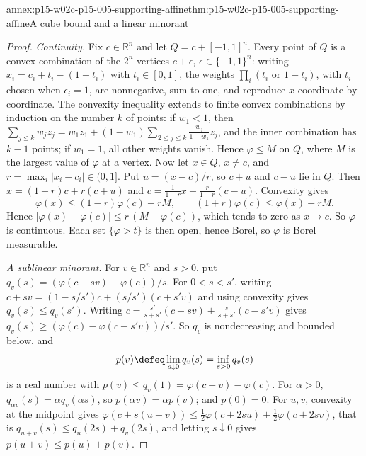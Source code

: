 \begin{annexitem}{annex:p15-w02c-p15-005-supporting-affine}{thm:p15-w02c-p15-005-supporting-affine}{A cube bound and a linear minorant}
\begin{proof}
\emph{Continuity.} Fix \(c\in\mathbb R^n\) and let
\(Q=c+[-1,1]^n\). Every point of \(Q\) is a convex combination of the
\(2^n\) vertices \(c+\epsilon\), \(\epsilon\in\{-1,1\}^n\): writing
\(x_i=c_i+t_i-(1-t_i)\) with \(t_i\in[0,1]\), the weights
\(\prod_i(t_i\text{ or }1-t_i)\), with \(t_i\) chosen when
\(\epsilon_i=1\), are nonnegative, sum to one, and reproduce \(x\)
coordinate by coordinate. The convexity inequality extends to finite
convex combinations by induction on the number \(k\) of points: if
\(w_1<1\), then
\(\sum_{j\leq k}w_jz_j=w_1z_1+(1-w_1)\sum_{2\leq j\leq k}\frac{w_j}{1-w_1}z_j\),
and the inner combination has \(k-1\) points; if \(w_1=1\), all other
weights vanish. Hence \(\varphi\leq M\) on \(Q\), where \(M\) is the
largest value of \(\varphi\) at a vertex. Now let \(x\in Q\),
\(x\neq c\), and \(r=\max_i|x_i-c_i|\in(0,1]\). Put
\(u=(x-c)/r\), so \(c+u\) and \(c-u\) lie in \(Q\). Then
\(x=(1-r)c+r(c+u)\) and \(c=\frac1{1+r}x+\frac r{1+r}(c-u)\). Convexity
gives
\[
 \varphi(x)\leq(1-r)\varphi(c)+rM,\qquad
 (1+r)\varphi(c)\leq\varphi(x)+rM .
\]
Hence \(|\varphi(x)-\varphi(c)|\leq r\,(M-\varphi(c))\), which tends to
zero as \(x\to c\). So \(\varphi\) is continuous. Each set
\(\{\varphi>t\}\) is then open, hence Borel, so \(\varphi\) is Borel
measurable.

\emph{A sublinear minorant.} For \(v\in\mathbb R^n\) and \(s>0\), put
\(q_v(s)=(\varphi(c+sv)-\varphi(c))/s\). For \(0<s<s'\), writing
\(c+sv=(1-s/s')c+(s/s')(c+s'v)\) and using convexity gives
\(q_v(s)\leq q_v(s')\). Writing
\(c=\frac{s'}{s+s'}(c+sv)+\frac s{s+s'}(c-s'v)\) gives
\(q_v(s)\geq(\varphi(c)-\varphi(c-s'v))/s'\). So \(q_v\) is
nondecreasing and bounded below, and
\[
 p(v)\defeq\lim_{s\downarrow0}q_v(s)=\inf_{s>0}q_v(s)
\]
is a real number with \(p(v)\leq q_v(1)=\varphi(c+v)-\varphi(c)\). For
\(\alpha>0\), \(q_{\alpha v}(s)=\alpha q_v(\alpha s)\), so
\(p(\alpha v)=\alpha p(v)\); and \(p(0)=0\). For \(u,v\), convexity at
the midpoint gives
\(\varphi(c+s(u+v))\leq\frac12\varphi(c+2su)+\frac12\varphi(c+2sv)\),
that is \(q_{u+v}(s)\leq q_u(2s)+q_v(2s)\), and letting
\(s\downarrow0\) gives \(p(u+v)\leq p(u)+p(v)\).


\end{proof}
\end{annexitem}
